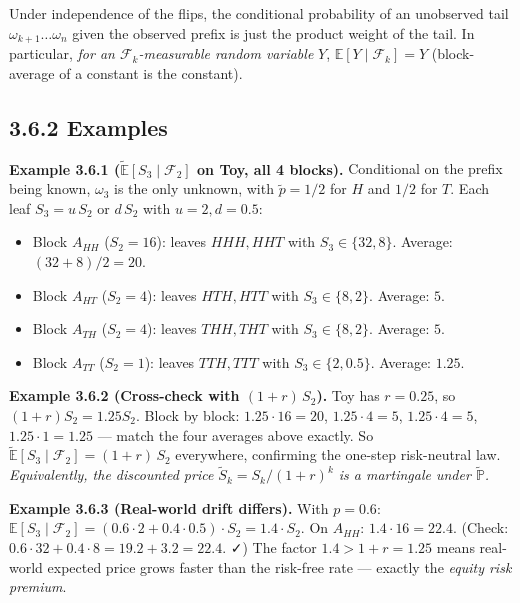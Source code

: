 \documentclass[
  10pt,
  twoside]{book}
\providecommand{\tightlist}{%
  \setlength{\itemsep}{0pt}\setlength{\parskip}{0pt}}
\begin{document}
Under independence of the flips, the conditional probability of an
unobserved tail \(\omega_{k+1}\ldots\omega_n\) given the observed prefix
is just the product weight of the tail. In particular, \emph{for an
\(\mathcal F_k\)-measurable random variable} \(Y\),
\(\mathbb E[Y \mid \mathcal F_k] = Y\) (block-average of a constant is
the constant).

\subsection{3.6.2 Examples}\label{examples-16}

\textbf{Example 3.6.1 (\(\tilde{\mathbb E}[S_3 \mid \mathcal F_2]\) on
Toy, all 4 blocks).} Conditional on the prefix being known, \(\omega_3\)
is the only unknown, with \(\tilde p = 1/2\) for \(H\) and \(1/2\) for
\(T\). Each leaf \(S_3 = u\,S_2\) or \(d\,S_2\) with \(u=2, d=0.5\):

\begin{itemize}
\tightlist
\item
  Block \(A_{HH}\) (\(S_2 = 16\)): leaves \(HHH, HHT\) with
  \(S_3 \in \{32, 8\}\). Average: \((32+8)/2 = 20\).
\item
  Block \(A_{HT}\) (\(S_2 = 4\)): leaves \(HTH, HTT\) with
  \(S_3 \in \{8, 2\}\). Average: \(5\).
\item
  Block \(A_{TH}\) (\(S_2 = 4\)): leaves \(THH, THT\) with
  \(S_3 \in \{8, 2\}\). Average: \(5\).
\item
  Block \(A_{TT}\) (\(S_2 = 1\)): leaves \(TTH, TTT\) with
  \(S_3 \in \{2, 0.5\}\). Average: \(1.25\).
\end{itemize}

\textbf{Example 3.6.2 (Cross-check with \((1+r)\, S_2\)).} Toy has
\(r=0.25\), so \((1+r)S_2 = 1.25 S_2\). Block by block:
\(1.25\cdot 16=20\), \(1.25\cdot 4=5\), \(1.25\cdot 4=5\),
\(1.25\cdot 1=1.25\) --- match the four averages above exactly. So
\(\tilde{\mathbb E}[S_3 \mid \mathcal F_2] = (1+r)\, S_2\) everywhere,
confirming the one-step risk-neutral law. \emph{Equivalently, the
discounted price \(\widetilde S_k = S_k/(1+r)^k\) is a martingale under
\(\tilde{\mathbb P}\).}

\textbf{Example 3.6.3 (Real-world drift differs).} With \(p = 0.6\):
\(\mathbb E[S_3 \mid \mathcal F_2] = (0.6\cdot 2 + 0.4 \cdot 0.5)\cdot S_2 = 1.4\cdot S_2\).
On \(A_{HH}\): \(1.4 \cdot 16 = 22.4\). (Check:
\(0.6 \cdot 32 + 0.4 \cdot 8 = 19.2 + 3.2 = 22.4\). ✓) The factor
\(1.4 > 1+r = 1.25\) means real-world expected price grows faster than
the risk-free rate --- exactly the \emph{equity risk premium}.
\end{document}
